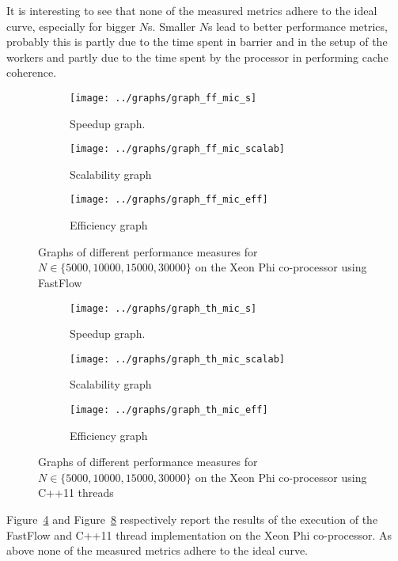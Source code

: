 It is interesting to see that none of the measured metrics adhere to the ideal curve, especially for bigger $N$s.
Smaller $N$s lead to better performance metrics, probably this is partly due to the time spent in barrier and in the setup of the workers and partly due to the time spent by the processor in performing cache coherence.
\begin{figure}
	\centering
	\begin{subfigure}[b]{0.3\textwidth}
		\texttt{[image: ../graphs/graph\_ff\_mic\_s]}
		\caption{Speedup graph.}
		\label{fig:ff_mic_s}
	\end{subfigure}
	\begin{subfigure}[b]{0.3\textwidth}
		\texttt{[image: ../graphs/graph\_ff\_mic\_scalab]}
		\caption{Scalability graph}
		\label{fig:ff_mic_scalab}
	\end{subfigure}
	\begin{subfigure}[b]{0.3\textwidth}
		\texttt{[image: ../graphs/graph\_ff\_mic\_eff]}
		\caption{Efficiency graph}
		\label{fig:ff_mic_eff}
	\end{subfigure}
	\caption{Graphs of different performance measures for $N \in \{5000, 10000, 15000, 30000\}$ on the Xeon Phi co-processor using FastFlow}
	\label{fig:ff_mic}
\end{figure}
\begin{figure}
	\centering
	\begin{subfigure}[b]{0.3\textwidth}
		\texttt{[image: ../graphs/graph\_th\_mic\_s]}
		\caption{Speedup graph.}
		\label{fig:th_mic_s}
	\end{subfigure}
	\begin{subfigure}[b]{0.3\textwidth}
		\texttt{[image: ../graphs/graph\_th\_mic\_scalab]}
		\caption{Scalability graph}
		\label{fig:th_mic_scalab}
	\end{subfigure}
	\begin{subfigure}[b]{0.3\textwidth}
		\texttt{[image: ../graphs/graph\_th\_mic\_eff]}
		\caption{Efficiency graph}
		\label{fig:th_mic_eff}
	\end{subfigure}
	\caption{Graphs of different performance measures for $N \in \{5000, 10000, 15000, 30000\}$ on the Xeon Phi co-processor using C++11 threads}
	\label{fig:th_mic}
\end{figure}
Figure~\ref{fig:ff_mic} and Figure~\ref{fig:th_mic} respectively report the results of the execution of the FastFlow and C++11 thread implementation on the Xeon Phi co-processor.
As above none of the measured metrics adhere to the ideal curve.
